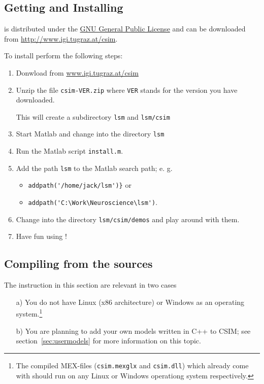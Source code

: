 \subsection{Getting and Installing \csim}

\csim is distributed under the
\href{http://www.gnu.org/copyleft/gpl.html}{GNU General Public
  License} and can be downloaded from
\url{http://www.igi.tugraz.at/csim}.


To install \csim perform the following steps:

\begin{enumerate}
\item Donwload \csim from \url{www.igi.tugraz.at/csim}
\item Unzip the file \texttt{csim-VER.zip} where \texttt{VER} stands
    for the version you have downloaded. 
    
    This will create a subdirectory \texttt{lsm} and \texttt{lsm/csim}

\item Start Matlab and change into the directory \texttt{lsm}
  
\item Run the Matlab script \texttt{install.m}.
  
\item Add the path \texttt{lsm} to the Matlab search path; e. g.
\begin{itemize}
\item  \verb#addpath('/home/jack/lsm')}# or
\item  \verb#addpath('C:\Work\Neuroscience\lsm')#.
\end{itemize}

\item Change into the directory \texttt{lsm/csim/demos} and play
  around with them.

\item Have fun using \csim !

\end{enumerate}


\subsection{Compiling \csim from the sources}
\label{sec:compile}

The instruction in this section are relevant in two cases

\begin{enumerate}

\item[a)] You do not have Linux (x86 architecture) or Windows as an operating
  system.\footnote{The compiled MEX-files (\texttt{csim.mexglx} and
\texttt{csim.dll}) which already come with \csim should run on any
Linux or Windows operationg system respectively.}

\item[b)] You are planning to add your own models written in C++ to CSIM; see
  section~\ref{sec:usermodels} for more information on this topic.

\end{enumerate}

